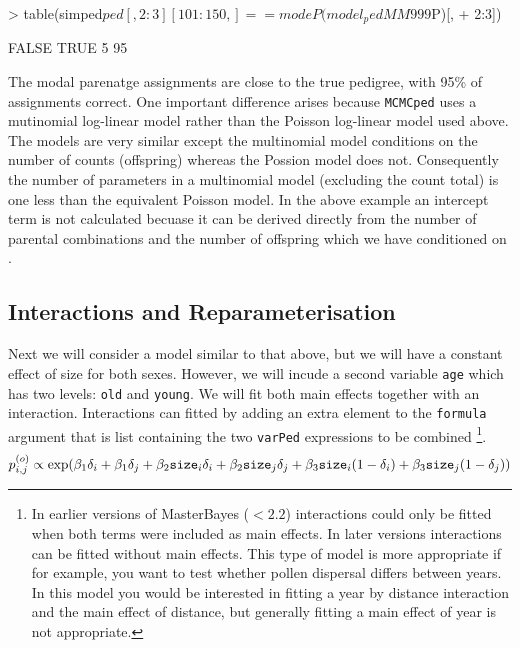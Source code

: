 \documentclass{article}
\begin{document}
\begin{Schunk}
\begin{Sinput}
> table(simped$ped[, 2:3][101:150, ] == modeP(model_pedMM999$P)[, 
+     2:3])
\end{Sinput}
\begin{Soutput}
FALSE  TRUE 
    5    95 
\end{Soutput}
\end{Schunk}

The modal parenatge assignments are close to the true pedigree, with 95\% of assignments correct. One important difference arises because \texttt{MCMCped} uses a mutinomial log-linear model rather than the Poisson log-linear model used above.  The models are very similar except the multinomial model conditions on the number of counts (offspring) whereas the Possion model does not. Consequently the number of parameters in a multinomial model (excluding the count total) is one less than the equivalent Poisson model. In the above example an intercept term is not calculated becuase it can be derived directly from the number of parental combinations and the number of offspring which we have conditioned on \citep{McCullagh.1989}.  

\subsection{Interactions and Reparameterisation}

Next we will consider a model similar to that above, but we will have a constant effect of size for both sexes.  However, we will incude a second variable \texttt{age} which has two levels: \texttt{old} and \texttt{young}. We will fit both main effects together with an interaction.  Interactions can fitted by adding an extra element to the \texttt{formula} argument that is list containing the two \texttt{varPed} expressions to be combined \footnote{In earlier versions of MasterBayes ($<2.2$) interactions could only be fitted when both terms were included as main effects.  In later versions interactions can be fitted without main effects. This type of model is more appropriate if for example, you want to test whether pollen dispersal differs between years. In this model you would be interested in fitting a year by distance interaction and the main effect of distance, but generally fitting a main effect of year is not appropriate.}.\\

\begin{equation}
p^{(o)}_{i,j} \propto \textrm{exp}(\beta_{1}\delta_{i}+\beta_{1}\delta_{j}+\beta_{2}\textrm{\texttt{size}}_{i}\delta_{i}+\beta_{2}\textrm{\texttt{size}}_{j}\delta_{j}+\beta_{3}\textrm{\texttt{size}}_{i}(1-\delta_{i})+\beta_{3}\textrm{\texttt{size}}_{j}(1-\delta_{j}))
\label{int-eq}
\end{equation}
\end{document}
